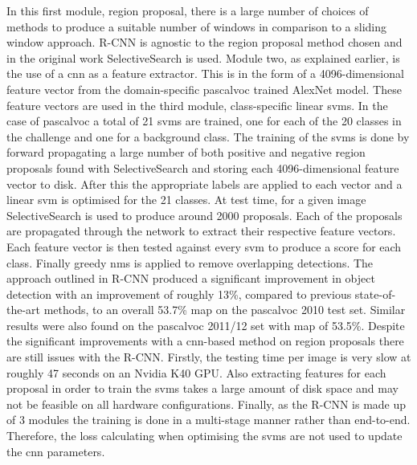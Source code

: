 In this first module, region proposal, there is a large number of choices of methods to produce a suitable number of windows in comparison to a sliding window approach. R-CNN is agnostic to the region proposal method chosen and in the original work SelectiveSearch \cite{selectivesearch} is used. Module two, as explained earlier, is the use of a \gls{cnn} as a feature extractor. This is in the form of a 4096-dimensional feature vector from the domain-specific \gls{pascalvoc} trained AlexNet model. These feature vectors are used in the third module, class-specific linear \glspl{svm}. In the case of \gls{pascalvoc} a total of 21 \glspl{svm} are trained, one for each of the 20 classes in the challenge and one for a background class. The training of the \glspl{svm} is done by forward propagating a large number of both positive and negative region proposals found with SelectiveSearch and storing each 4096-dimensional feature vector to disk. After this the appropriate labels are applied to each vector and a linear \gls{svm} is optimised for the 21 classes. At test time, for a given image SelectiveSearch is used to produce around 2000 proposals. Each of the proposals are propagated through the network to extract their respective feature vectors. Each feature vector is then tested against every \gls{svm} to produce a score for each class. Finally greedy \gls{nms} is applied to remove overlapping detections. The approach outlined in R-CNN produced a significant improvement in object detection with an improvement of roughly 13\%, compared to previous state-of-the-art methods, to an overall 53.7\% \gls{map} on the \gls{pascalvoc} 2010 test set. Similar results were also found on the \gls{pascalvoc} 2011/12 set with \gls{map} of 53.5\%. Despite the significant improvements with a \gls{cnn}-based method on region proposals there are still issues with the R-CNN. Firstly, the testing time per image is very slow at roughly 47 seconds on an Nvidia K40 GPU. Also extracting features for each proposal in order to train the \glspl{svm} takes a large amount of disk space and may not be feasible on all hardware configurations. Finally, as the R-CNN is made up of 3 modules the training is done in a multi-stage manner rather than end-to-end. Therefore, the loss calculating when optimising the \glspl{svm} are not used to update the \gls{cnn} parameters.
\\\\
